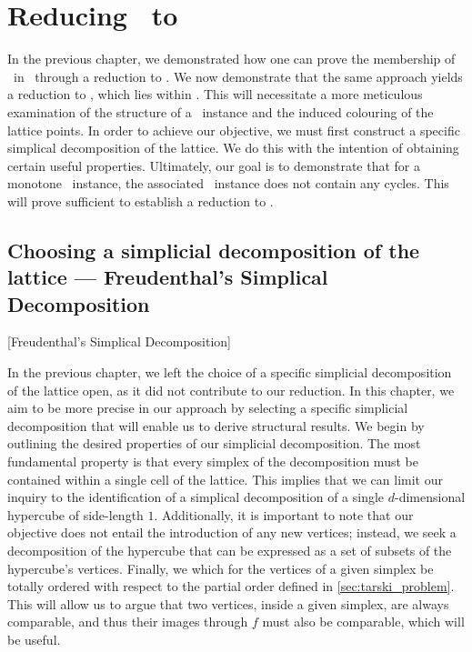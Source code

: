 \setchapterpreamble[u]{\margintoc}
\chapter{Reducing \Tarski\ to \EOPL}

In the previous chapter, we demonstrated how one can prove the membership of \Tarski\ in \PPAD\ through a reduction to \Sperner. We now demonstrate that the same approach yields a reduction to \EndOfPotentialLine, which lies within \EOPL. This will necessitate a more meticulous examination of the structure of a \Tarski\ instance and the induced colouring of the lattice points. In order to achieve our objective, we must first construct a specific simplical decomposition of the lattice. We do this with the intention of obtaining certain useful properties. Ultimately, our goal is to demonstrate that for a monotone \Tarski\ instance, the associated \EndOfLine\ instance does not contain any cycles. This will prove sufficient to establish a reduction to \EndOfPotentialLine.

\section{Choosing a simplicial decomposition of the lattice --- Freudenthal's Simplical Decomposition}[Freudenthal's Simplical Decomposition]
\label{sec:freudenthal_simplicial_decomposition}

In the previous chapter, we left the choice of a specific simplicial decomposition of the lattice open, as it did not contribute to our reduction. In this chapter, we aim to be more precise in our approach by selecting a specific simplicial decomposition that will enable us to derive structural results. We begin by outlining the desired properties of our simplicial decomposition. The most fundamental property is that every simplex of the decomposition must be contained within a single cell of the lattice. This implies that we can limit our inquiry to the identification of a simplical decomposition of a single $d$-dimensional hypercube of side-length $1$. Additionally, it is important to note that our objective does not entail the introduction of any new vertices; instead, we seek a decomposition of the hypercube that can be expressed as a set of subsets of the hypercube's vertices.	Finally, we which for the vertices of a given simplex be totally ordered with respect to the partial order defined in \cref{sec:tarski_problem}. This will allow us to argue that two vertices, inside a given simplex, are always comparable, and thus their images through $f$ must also be comparable, which will be useful.

